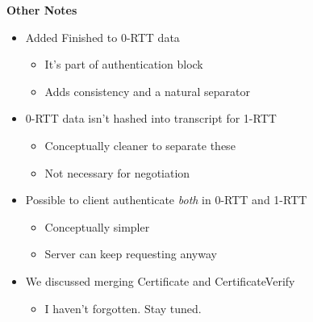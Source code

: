 \documentclass[helvetica]{seminar}
\newcommand{\heading}[1]{%
  \begin{center} 
    \large\bf 
    #1 
  \end{center} 
  \vspace{.4 in}}
\begin{document}
\begin{slide}
\heading{Other Notes}

\begin{itemize}
\item Added Finished to 0-RTT data
  \begin{itemize}
  \item It's part of authentication block
  \item Adds consistency and a natural separator
  \end{itemize}

\item 0-RTT data isn't hashed into transcript for 1-RTT
  \begin{itemize}
  \item Conceptually cleaner to separate these
  \item Not necessary for negotiation
  \end{itemize}

\item Possible to client authenticate \emph{both} in 0-RTT and 1-RTT
  \begin{itemize}
  \item Conceptually simpler
  \item Server can keep requesting anyway
  \end{itemize}

\item We discussed merging Certificate and CertificateVerify
  \begin{itemize}
  \item I haven't forgotten. Stay tuned.
  \end{itemize}
\end{itemize}
\end{slide}
\end{document}
